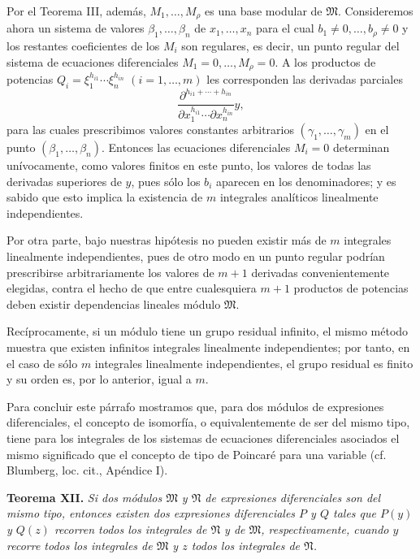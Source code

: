 \documentclass[11pt]{article}
\begin{document}
Por el Teorema III, además, $M_1,\ldots,M_\rho$ es una base modular de $\mathfrak M$. Consideremos ahora un sistema de valores $\beta_1,\ldots,\beta_n$ de $x_1,\ldots,x_n$ para el cual $b_1\ne0,\ldots,b_\rho\ne0$ y los restantes coeficientes de los $M_i$ son regulares, es decir, un punto regular del sistema de ecuaciones diferenciales $M_1=0,\ldots,M_\rho=0$. A los productos de potencias $Q_i=\xi_1^{h_{i1}}\cdots\xi_n^{h_{in}}$ $(i=1,\ldots,m)$ les corresponden las derivadas parciales
\[
 \frac{\partial^{h_{i1}+\cdots+h_{in}}}{\partial x_1^{h_{i1}}\cdots\partial x_n^{h_{in}}}y,
\]
para las cuales prescribimos valores constantes arbitrarios $(\gamma_1,\ldots,\gamma_m)$ en el punto $(\beta_1,\ldots,\beta_n)$. Entonces las ecuaciones diferenciales $M_i=0$ determinan unívocamente, como valores finitos en este punto, los valores de todas las derivadas superiores de $y$, pues sólo los $b_i$ aparecen en los denominadores; y es sabido que esto implica la existencia de $m$ integrales analíticos linealmente independientes.

Por otra parte, bajo nuestras hipótesis no pueden existir más de $m$ integrales linealmente independientes, pues de otro modo en un punto regular podrían prescribirse arbitrariamente los valores de $m+1$ derivadas convenientemente elegidas, contra el hecho de que entre cualesquiera $m+1$ productos de potencias deben existir dependencias lineales módulo $\mathfrak M$.

Recíprocamente, si un módulo tiene un grupo residual infinito, el mismo método muestra que existen infinitos integrales linealmente independientes; por tanto, en el caso de sólo $m$ integrales linealmente independientes, el grupo residual es finito y su orden es, por lo anterior, igual a $m$.

Para concluir este párrafo mostramos que, para dos módulos de expresiones diferenciales, el concepto de isomorfía, o equivalentemente de ser del mismo tipo, tiene para los integrales de los sistemas de ecuaciones diferenciales asociados el mismo significado que el concepto de tipo de Poincaré para una variable (cf. Blumberg, loc. cit., Apéndice I).

\textbf{Teorema XII.} \emph{Si dos módulos $\mathfrak M$ y $\mathfrak N$ de expresiones diferenciales son del mismo tipo, entonces existen dos expresiones diferenciales $P$ y $Q$ tales que $P(y)$ y $Q(z)$ recorren todos los integrales de $\mathfrak N$ y de $\mathfrak M$, respectivamente, cuando $y$ recorre todos los integrales de $\mathfrak M$ y $z$ todos los integrales de $\mathfrak N$.}
\end{document}
